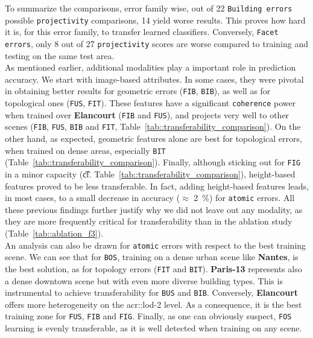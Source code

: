         To summarize the comparisons, error family wise, out of 22 \texttt{Building errors} possible \texttt{projectivity} comparisons, 14 yield worse results.
        This proves how hard it is, for this error family, to transfer learned classifiers.
        Conversely, \texttt{Facet errors}, only 8 out of 27 \texttt{projectivity} scores are worse compared to training and testing on the same test area.\\

        As mentioned earlier, additional modalities play a important role in prediction accuracy.
        We start with image-based attributes.
        In some cases, they were pivotal in obtaining better results for geometric errors (\texttt{FIB}, \texttt{BIB}), as well as for topological ones (\texttt{FUS}, \texttt{FIT}).
        These features have a significant \texttt{coherence} power when trained over \textbf{Elancourt} (\texttt{FIB} and \texttt{FUS}), and projects very well to other scenes (\texttt{FIB}, \texttt{FUS}, \texttt{BIB} and \texttt{FIT}, Table~\ref{tab::transferability_comparison}).
        On the other hand, as expected, geometric features alone are best for topological errors, when trained on dense areas, especially \texttt{BIT} (Table~\ref{tab::transferability_comparison}).
        Finally, although sticking out for \texttt{FIG} in a minor capacity (\t{cf.} Table~\ref{tab::transferability_comparison}), height-based features proved to be less transferable.
        In fact, adding height-based features leads, in most cases, to a small decrease in accuracy ($\approx$ \SI{2}{\percent}) for \texttt{atomic} errors.
        All these previous findings further justify why we did not leave out any modality, as they are more frequently critical for transferability than in the ablation study (Table~\ref{tab::ablation_f3}).\\

        An analysis can also be drawn for \texttt{atomic} errors with respect to the best training scene.
        We can see that for \texttt{BOS}, training on a dense urban scene like \textbf{Nantes}, is the best solution, as for topology errors (\texttt{FIT} and \texttt{BIT}).
        \textbf{Paris-13} represents also a dense downtown scene but with even more diverse building types.
        This is instrumental to achieve transferability for \texttt{BUS} and \texttt{BIB}.
        Conversely, \textbf{Elancourt} offers more heterogeneity on the \gls{acr::lod}-2 level.
        As a consequence, it is the best training zone for \texttt{FUS}, \texttt{FIB} and \texttt{FIG}.
        Finally, as one can obviously suspect, \texttt{FOS} learning is evenly transferable, as it is well detected when training on any scene.

